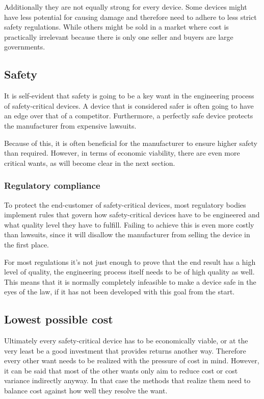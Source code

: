 Additionally they are not equally strong for every device. Some devices might have less potential for causing damage and therefore need to adhere to less strict safety regulations. While others might be sold in a market where cost is practically irrelevant because there is only one seller and buyers are large governments. 


\subsection{Safety}
It is self-evident that safety is going to be a key want in the engineering process of safety-critical devices. A device that is considered safer is often going to have an edge over that of a competitor. Furthermore, a perfectly safe device protects the manufacturer from expensive lawsuits.

Because of this, it is often beneficial for the manufacturer to ensure higher safety than required. However, in terms of economic viability, there are even more critical wants, as will become clear in the next section.

\subsubsection{Regulatory compliance}
To protect the end-customer of safety-critical devices, most regulatory bodies implement rules that govern how safety-critical devices have to be engineered and what quality level they have to fulfill.
Failing to achieve this is even more costly than lawsuits, since it will disallow the manufacturer from selling the device in the first place. 

For most regulations it’s not just enough to prove that the end result has a high level of quality, the engineering process itself needs to be of high quality as well. This means that it is normally completely infeasible to make a device safe in the eyes of the law, if it has not been developed with this goal from the start.

\subsection{Lowest possible cost}
Ultimately every safety-critical device has to be economically viable, or at the very least be a good investment that provides returns another way. 
Therefore every other want needs to be realized with the pressure of cost in mind. However, it can be said that most of the other wants only aim to reduce cost or cost variance indirectly anyway. In that case the methods that realize them need to balance cost against how well they resolve the want.

